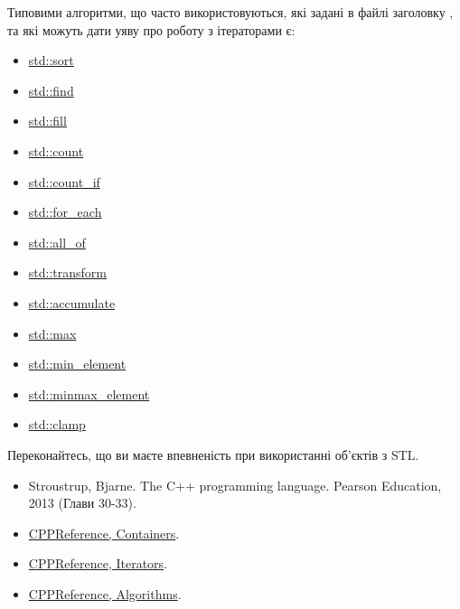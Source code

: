 \documentclass[12pt]{article}
\begin{document}
	Типовими алгоритми, що часто використовуються, які задані в файлі заголовку , та які можуть дати уяву про роботу з ітераторами є:
	\begin{itemize}
		\item \href{https://en.cppreference.com/w/cpp/algorithm/sort}{std::sort}
		\item \href{https://en.cppreference.com/w/cpp/algorithm/find}{std::find}
		\item \href{https://en.cppreference.com/w/cpp/algorithm/fill}{std::fill}
		\item \href{https://en.cppreference.com/w/cpp/algorithm/count}{std::count}
		\item \href{https://en.cppreference.com/w/cpp/algorithm/count_if}{std::count\_if}
		\item \href{https://en.cppreference.com/w/cpp/algorithm/for_each}{std::for\_each}
		\item \href{https://en.cppreference.com/w/cpp/algorithm/all_of}{std::all\_of}
		\item \href{https://en.cppreference.com/w/cpp/algorithm/transform}{std::transform}
		\item \href{https://en.cppreference.com/w/cpp/algorithm/accumulate}{std::accumulate}
		\item \href{https://en.cppreference.com/w/cpp/algorithm/max}{std::max}
		\item \href{https://en.cppreference.com/w/cpp/algorithm/min_element}{std::min\_element}
		\item \href{https://en.cppreference.com/w/cpp/algorithm/minmax_element}{std::minmax\_element}
		\item \href{https://en.cppreference.com/w/cpp/algorithm/clamp}{std::clamp}
	\end{itemize}

	Переконайтесь, що ви маєте впевненість при використанні об'єктів з STL.

	
	\begin{itemize}
		\item Stroustrup, Bjarne. The C++ programming language. Pearson Education, 2013 (Глави 30-33).
		\item \href{https://en.cppreference.com/w/cpp/container}{CPPReference, Containers}.
		\item \href{https://en.cppreference.com/w/cpp/iterators}{CPPReference, Iterators}.
		\item \href{https://en.cppreference.com/w/cpp/algorithm}{CPPReference, Algorithms}.
	\end{itemize}
\end{document}
